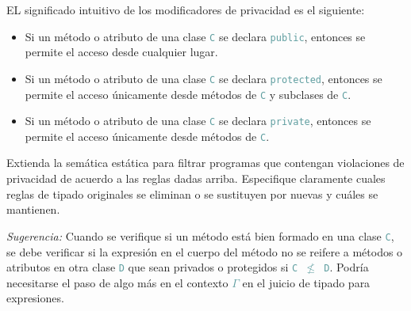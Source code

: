\documentclass{article}
\newcommand{\tx}[1]{\textcolor{CadetBlue} {\texttt{#1}}}
\newcommand{\ti}[1]{\textcolor{RoyalPurple} {\textit{#1}}}
\begin{document}
\begin{enumerate}
        EL significado intuitivo de los modificadores de privacidad es el 
        siguiente:

        \begin{itemize}
            \item Si un método o atributo de una clase \tx{C} se declara 
            \tx{public}, entonces se permite el acceso desde cualquier lugar.

            \item Si un método o atributo de una clase \tx{C} se declara 
            \tx{protected}, entonces se permite el acceso únicamente desde
            métodos de \tx{C} y subclases de \tx{C}.

            \item Si un método o atributo de una clase \tx{C} se declara 
            \tx{private}, entonces se permite el acceso únicamente desde
            métodos de \tx{C}.
        \end{itemize}

        Extienda la semática estática para filtrar programas que contengan 
        violaciones de privacidad de acuerdo a las reglas dadas arriba. 
        Especifique claramente cuales reglas de tipado originales se eliminan o 
        se sustituyen por nuevas y cuáles se mantienen.

        \ti{Sugerencia:} Cuando se verifique si un método está bien formado en 
        una clase \tx{C}, se debe verificar si la expresión en el cuerpo del 
        método no se reifere a métodos o atributos en otra clase \tx{D} que sean
        privados o protegidos si \tx{C $\not \leq$ D}. Podría necesitarse el 
        paso de algo más en el contexto \tx{$\Gamma$} en el juicio de tipado 
        para expresiones.

    \end{enumerate}
\end{document}
